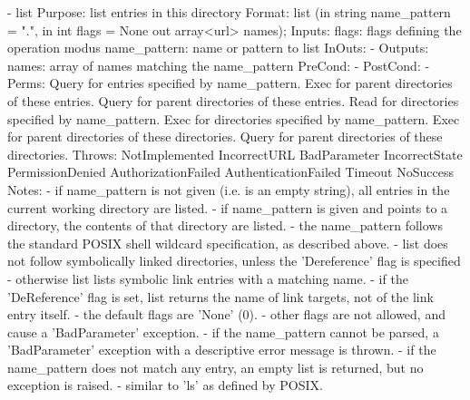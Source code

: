 \begin{myspec}
 
    - list
      Purpose:  list entries in this directory
      Format:   list               (in  string name_pattern = ".",
                                    in  int    flags        = None
                                    out array<url> names);
      Inputs:   flags:              flags defining the operation
                                    modus
                name_pattern:       name or pattern to list
      InOuts:   -
      Outputs:  names:              array of names matching the
                                    name_pattern
      PreCond:  -
      PostCond: -
      Perms:    Query for entries specified by name_pattern.
                Exec  for parent directories of these entries.
                Query for parent directories of these entries.
                Read  for directories specified by name_pattern.
                Exec  for directories specified by name_pattern.
                Exec  for parent directories of these directories.
                Query for parent directories of these directories.
      Throws:   NotImplemented
                IncorrectURL
                BadParameter
                IncorrectState
                PermissionDenied
                AuthorizationFailed
                AuthenticationFailed
                Timeout
                NoSuccess
      Notes:    - if name_pattern is not given (i.e. is an empty 
                  string), all entries in the current working 
                  directory are listed.
                - if name_pattern is given and points to a 
                  directory, the contents of that directory 
                  are listed.
                - the name_pattern follows the standard POSIX 
                  shell wildcard specification, as described 
                  above.
                - list does not follow symbolically linked
                  directories, unless the 'Dereference' flag
                  is specified - otherwise list lists symbolic 
                  link entries with a matching name.
                - if the 'DeReference' flag is set, list 
                  returns the name of link targets, not of the
                  link entry itself.
                - the default flags are 'None' (0).
                - other flags are not allowed, and cause a
                  'BadParameter' exception.
                - if the name_pattern cannot be parsed, a
                  'BadParameter' exception with a descriptive
                  error message is thrown.
                - if the name_pattern does not match any entry,
                  an empty list is returned, but no exception is
                  raised.
                - similar to 'ls' as defined by POSIX.
 

\end{myspec}

